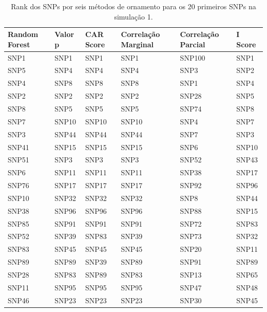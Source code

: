 \begin{table}[ht]
\centering
\begin{tabular}{llllll}
  \hline
Random Forest & Valor p & CAR Score & Correlação Marginal & Correlação Parcial & I Score \\ 
  \hline
SNP1 & SNP1 & SNP1 & SNP1 & SNP100 & SNP1 \\ 
  SNP5 & SNP4 & SNP4 & SNP4 & SNP3 & SNP2 \\ 
  SNP4 & SNP8 & SNP8 & SNP8 & SNP1 & SNP4 \\ 
  SNP2 & SNP2 & SNP2 & SNP2 & SNP28 & SNP5 \\ 
  SNP8 & SNP5 & SNP5 & SNP5 & SNP74 & SNP8 \\ 
  SNP7 & SNP10 & SNP10 & SNP10 & SNP4 & SNP7 \\ 
  SNP3 & SNP44 & SNP44 & SNP44 & SNP7 & SNP3 \\ 
  SNP41 & SNP15 & SNP15 & SNP15 & SNP6 & SNP10 \\ 
  SNP51 & SNP3 & SNP3 & SNP3 & SNP52 & SNP43 \\ 
  SNP6 & SNP11 & SNP11 & SNP11 & SNP38 & SNP17 \\ 
  SNP76 & SNP17 & SNP17 & SNP17 & SNP92 & SNP96 \\ 
  SNP10 & SNP32 & SNP32 & SNP32 & SNP8 & SNP44 \\ 
  SNP38 & SNP96 & SNP96 & SNP96 & SNP88 & SNP15 \\ 
  SNP85 & SNP91 & SNP91 & SNP91 & SNP72 & SNP83 \\ 
  SNP52 & SNP39 & SNP83 & SNP39 & SNP73 & SNP32 \\ 
  SNP83 & SNP45 & SNP45 & SNP45 & SNP20 & SNP11 \\ 
  SNP89 & SNP89 & SNP39 & SNP89 & SNP91 & SNP89 \\ 
  SNP28 & SNP83 & SNP89 & SNP83 & SNP13 & SNP65 \\ 
  SNP11 & SNP95 & SNP95 & SNP95 & SNP47 & SNP48 \\ 
  SNP46 & SNP23 & SNP23 & SNP23 & SNP30 & SNP45 \\ 
   \hline
\end{tabular}
\caption{Rank dos SNPs por seis métodos de ornamento para os 20 primeiros SNPs na simulação 1.} 
\label{tab:ranks}
\end{table}

